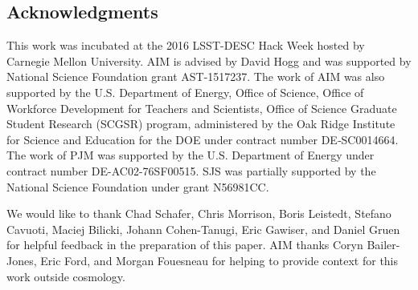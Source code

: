 \documentclass[\docopts]{\docclass}
\begin{document}
\subsection*{Acknowledgments}


This work was incubated at the 2016 LSST-DESC Hack Week hosted by Carnegie 
Mellon University.
AIM is advised by David Hogg and was supported by National Science Foundation 
grant AST-1517237.
The work of AIM was also supported by the U.S. Department of Energy, Office of 
Science, Office of Workforce Development for Teachers and Scientists, Office of 
Science Graduate Student Research (SCGSR) program, administered by the Oak 
Ridge Institute for Science and Education for the DOE under contract number 
DE‐SC0014664.
The work of PJM was supported by the U.S. Department of Energy under contract 
number DE-AC02-76SF00515.
SJS was partially supported by the National Science Foundation under grant 
N56981CC.


We would like to thank Chad Schafer, Chris Morrison, Boris Leistedt, Stefano 
Cavuoti, Maciej Bilicki, Johann Cohen-Tanugi, Eric Gawiser, and Daniel Gruen 
for helpful feedback in the preparation of this paper.
AIM thanks Coryn Bailer-Jones, Eric Ford, and Morgan Fouesneau for helping to 
provide context for this work outside cosmology.








\end{document}

